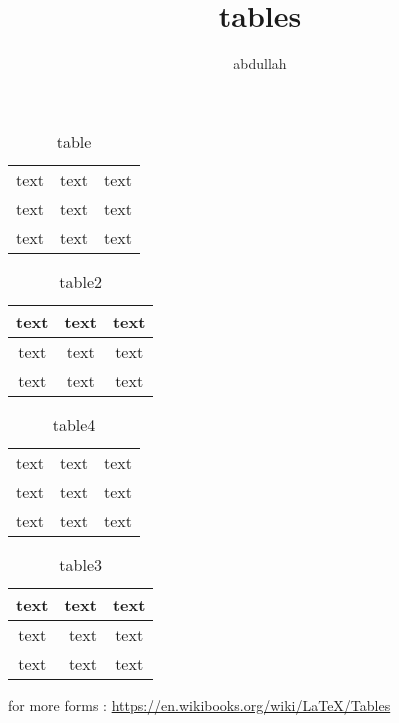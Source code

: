 \documentclass{article}
\title{tables}
\author{abdullah}
\date{}
\begin{document}
	
\begin{table}[!h]
	\centering
	\caption{table}
	\label{t1}
\begin{tabular}{lcr}%
	text&text&text\\
	text&text&text\\
	text&text&text
\end{tabular}
\end{table}
\begin{table}[h]
	\centering
	\caption{table2}
	\label{t2}
\begin{tabular}{ccc}
	\hline
	text&text&text\\
	\hline
	text&text&text\\
	\hline
	text&text&text\\
	\hline
\end{tabular}
\end{table}
\begin{table}[h]
	\centering
	\caption{table4}
	\label{t4}
\begin{tabular}{|c|r|c|}
	text&text&text\\
	text&text&text\\
	text&text&text
\end{tabular}
\end{table}
\begin{table}[h!]
\centering
\caption{table3}
\label{t3}
\begin{tabular}{|c|r|c|}
	\hline
	text&text&text\\
	\hline
	text&text&text\\
	\hline
	text&text&text\\
	\hline
\end{tabular}
\end{table}
for more forms :
\url{https://en.wikibooks.org/wiki/LaTeX/Tables}
\end{document}
